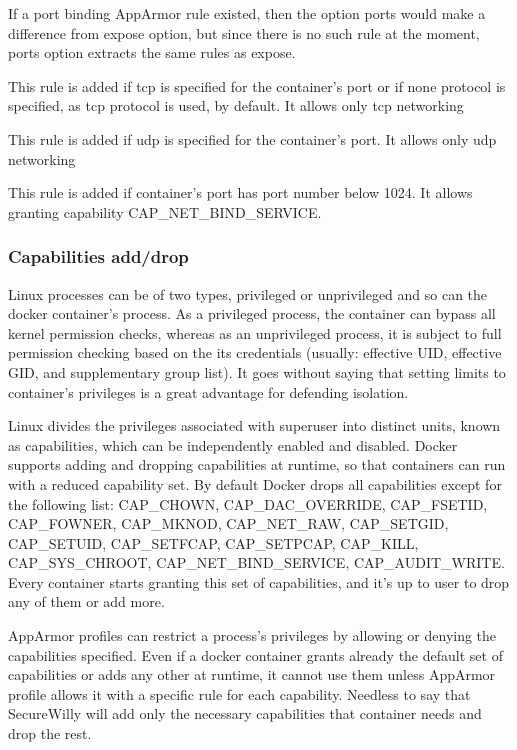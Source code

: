 If a port binding AppArmor rule existed, then the option ports would make a difference from expose option, but since there is no such rule at the moment, ports option extracts the same rules as expose.

\begin{description}[style=nextline]
\item[network tcp]
This rule is added if tcp is specified for the container's port or if none protocol is specified, as tcp protocol is used, by default. It allows only tcp networking
\item[network udp]
This rule is added if udp is specified for the container's port. It allows only udp networking
\item[capability net\_bind\_service]
This rule is added if container's port has port number below 1024. It allows granting capability CAP\_NET\_BIND\_SERVICE.
\end{description}

\subsubsection{Capabilities add/drop}
Linux processes can be of two types, privileged or unprivileged and so can the docker container's process. As a privileged process, the container can bypass all kernel permission checks, whereas as an unprivileged process, it is subject to full permission checking based on the its credentials (usually: effective UID, effective GID, and supplementary group list).\cite{containercaps} It goes without saying that setting limits to container's privileges is a great advantage for defending isolation.

Linux divides the privileges associated with superuser into distinct units, known as capabilities, which can be independently enabled and disabled. Docker supports adding and dropping capabilities at runtime, so that containers can run with a reduced capability set. By default Docker drops all capabilities except for the following list: CAP\_CHOWN, CAP\_DAC\_OVERRIDE, CAP\_FSETID, CAP\_FOWNER, CAP\_MKNOD, CAP\_NET\_RAW, CAP\_SETGID, CAP\_SETUID, CAP\_SETFCAP, CAP\_SETPCAP, CAP\_KILL, \\CAP\_SYS\_CHROOT, CAP\_NET\_BIND\_SERVICE, CAP\_AUDIT\_WRITE. Every container starts granting this set of capabilities, and it's up to user to drop any of them or add more.

AppArmor profiles can restrict a process's privileges by allowing or denying the capabilities specified. Even if a docker container grants already the default set of capabilities or adds any other at runtime, it cannot use them unless AppArmor profile allows it with a specific rule for each capability. Needless to say that SecureWilly will add only the necessary capabilities that container needs and drop the rest.

